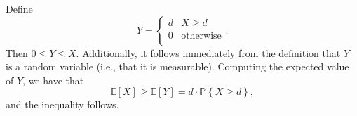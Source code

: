 \documentclass[12pt]{article}
\begin{document}
Define
$$
Y = \begin{cases}
  d & X \ge d \\
  0 & \text{otherwise} \\
\end{cases}.
$$
Then $0 \le Y \le X$.  Additionally, it follows immediately from the definition that $Y$ is a random variable (i.e., that it is measurable).  Computing the expected value of $Y$, we have that
$$
\mathbb{E}[X] \ge \mathbb{E}[Y] = d\cdot\mathbb{P}_{}\left\{X \ge d\right\},
$$
and the inequality follows.
\end{document}
